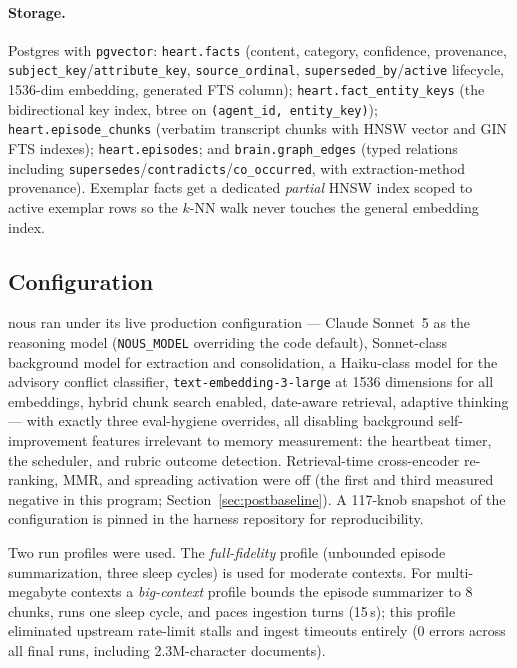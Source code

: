 \documentclass{article}
\newcommand{\nous}{\textsf{nous}}
\begin{document}
\paragraph{Storage.}
Postgres with \texttt{pgvector}: \texttt{heart.facts} (content, category,
confidence, provenance, \texttt{subject\_key}/\texttt{attribute\_key},
\texttt{source\_ordinal}, \texttt{superseded\_by}/\texttt{active} lifecycle,
1536-dim embedding, generated FTS column);
\texttt{heart.fact\_entity\_keys} (the bidirectional key index, btree on
\texttt{(agent\_id, entity\_key)}); \texttt{heart.episode\_chunks} (verbatim
transcript chunks with HNSW vector and GIN FTS indexes);
\texttt{heart.episodes}; and \texttt{brain.graph\_edges} (typed relations
including \texttt{supersedes}/\texttt{contradicts}/\texttt{co\_occurred},
with extraction-method provenance). Exemplar facts get a dedicated
\emph{partial} HNSW index scoped to active exemplar rows so the $k$-NN walk
never touches the general embedding index.

\subsection{Configuration}
\nous{} ran under its live production configuration --- Claude Sonnet~5 as
the reasoning model (\texttt{NOUS\_MODEL} overriding the code default),
Sonnet-class background model for extraction and consolidation, a
Haiku-class model for the advisory conflict classifier,
\texttt{text-embedding-3-large} at 1536 dimensions for all embeddings,
hybrid chunk search enabled, date-aware retrieval, adaptive thinking ---
with exactly three eval-hygiene overrides, all disabling background
self-improvement features irrelevant to memory measurement: the heartbeat
timer, the scheduler, and rubric outcome detection. Retrieval-time
cross-encoder re-ranking, MMR, and spreading activation were off (the first
and third measured negative in this program; Section~\ref{sec:postbaseline}).
A 117-knob snapshot of the configuration is pinned in the harness repository
for reproducibility.

Two run profiles were used. The \emph{full-fidelity} profile (unbounded
episode summarization, three sleep cycles) is used for moderate contexts.
For multi-megabyte contexts a \emph{big-context} profile bounds the episode
summarizer to 8 chunks, runs one sleep cycle, and paces ingestion turns
(15\,s); this profile eliminated upstream rate-limit stalls and ingest
timeouts entirely (0 errors across all final runs, including 2.3M-character
documents).
\end{document}
